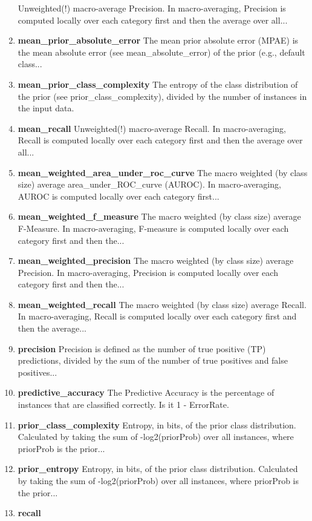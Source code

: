 \documentclass[a4paper,12pt, english]{article}
\begin{document}
\begin{enumerate}
Unweighted(!) macro-average Precision. In macro-averaging, Precision is computed locally over each category ﬁrst and then the average over all...
\item \textbf{mean\_prior\_absolute\_error}
The mean prior absolute error (MPAE) is the mean absolute error (see mean\_absolute\_error) of the prior (e.g., default class...
\item \textbf{mean\_prior\_class\_complexity}
The entropy of the class distribution of the prior (see prior\_class\_complexity), divided by the number of instances in the input data.
\item \textbf{mean\_recall}
Unweighted(!) macro-average Recall. In macro-averaging, Recall is computed locally over each category ﬁrst and then the average over all...
\item \textbf{mean\_weighted\_area\_under\_roc\_curve}
The macro weighted (by class size) average area\_under\_ROC\_curve (AUROC). In macro-averaging, AUROC is computed locally over each category ﬁrst...
\item \textbf{mean\_weighted\_f\_measure}
The macro weighted (by class size) average F-Measure. In macro-averaging, F-measure is computed locally over each category ﬁrst and then the...
\item \textbf{mean\_weighted\_precision}
The macro weighted (by class size) average Precision. In macro-averaging, Precision is computed locally over each category ﬁrst and then the...
\item \textbf{mean\_weighted\_recall}
The macro weighted (by class size) average Recall. In macro-averaging, Recall is computed locally over each category ﬁrst and then the average...
\item \textbf{precision}
Precision is defined as the number of true positive (TP) predictions, divided by the sum of the number of true positives and false positives...
\item \textbf{predictive\_accuracy}
The Predictive Accuracy is the percentage of instances that are classified correctly. Is it 1 - ErrorRate.
\item \textbf{prior\_class\_complexity}
Entropy, in bits, of the prior class distribution. Calculated by taking the sum of -log2(priorProb) over all instances, where priorProb is the prior...
\item \textbf{prior\_entropy}
Entropy, in bits, of the prior class distribution. Calculated by taking the sum of -log2(priorProb) over all instances, where priorProb is the prior...
\item \textbf{recall}

\end{enumerate}
\end{document}

